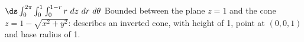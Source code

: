 {
$\ds \int_0^{2\pi}\int_0^1\int_0^{1-r} r\ dz\ dr\ d\theta$
}
{Bounded between the plane $z=1$ and the cone $z=1-\sqrt{x^2+y^2}$: describes an inverted cone, with height of 1, point at $(0,0,1)$ and base radius of 1.
}
